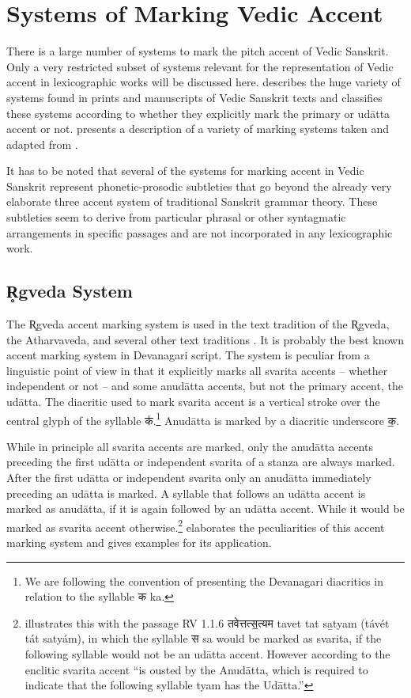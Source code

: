 \chapter{Systems of Marking Vedic Accent}

There is a large number of systems to mark the pitch accent of Vedic Sanskrit. Only a very restricted subset of systems relevant for the representation of  Vedic accent in lexicographic works will be discussed here. \citet{Witzel1974} describes the huge variety of systems found in prints and manuscripts of Vedic Sanskrit texts and classifies these systems according to whether they explicitly mark the primary or udātta accent or not. \citet{Scharf2007} presents a description of a variety of marking systems taken and adapted from \citet{MYV1964}.

It has to be noted that several of the systems for marking accent in Vedic Sanskrit represent phonetic-prosodic subtleties that go beyond the already very elaborate three accent system of traditional Sanskrit grammar theory. These subtleties seem to derive from particular phrasal or other syntagmatic arrangements in specific passages and are not incorporated in any lexicographic work.

\section{R̥gveda System}

The R̥gveda accent marking system is used in the text tradition of the R̥gveda, the Atharvaveda, and several other text traditions \citep[see][for more information]{Scharf2007}. It is probably the best known accent marking system in Devanagari script. The system is peculiar from a linguistic point of view in that it explicitly marks all svarita accents – whether independent or not – and some anudātta accents, but not the primary accent, the udātta. The diacritic used to mark svarita accent is a vertical stroke over the central glyph of the syllable  {\devfont क॑}.\footnote{We are following the convention of presenting the Devanagari diacritics in relation to the syllable {\devfont क} ka.} Anudātta is marked by a diacritic underscore {\devfont क॒}.

While in principle all svarita accents are marked, only the anudātta accents preceding the first udātta or independent svarita of a stanza are always marked. After the first udātta or independent svarita only an anudātta immediately preceding an udātta is marked. A syllable that follows an udātta accent is marked as anudātta, if it is again followed by an udātta accent. While it would be marked as svarita accent otherwise.\footnote{\citet[p.~449]{Macdonell1916} illustrates this with the passage RV 1.1.6 {\devfont तवेत्तत्स॒त्यम} tavet tat sa̲tyam (távét tát satyám), in which the syllable {\devfont स} sa would be marked as svarita, if the following syllable would not be an udātta accent. However according to \citet[p.~449]{Macdonell1916} the enclitic svarita accent “is ousted by the Anudātta, which is required to indicate that the following syllable tyam has the Udātta.”}  \citet[p.~449]{Macdonell1916} elaborates the peculiarities of this accent marking system and gives examples for its application.

